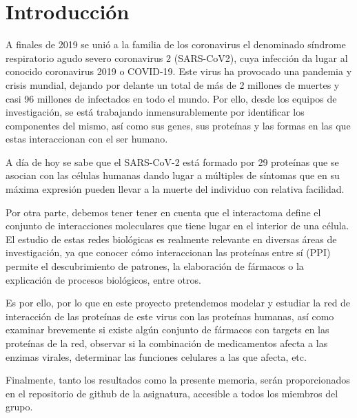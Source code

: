 \section{Introducción}

A finales de 2019 se unió a la familia de los coronavirus el denominado síndrome respiratorio agudo severo coronavirus 2 (SARS-CoV2), cuya infección da lugar al conocido coronavirus 2019 o COVID-19. Este virus ha provocado una pandemia y crisis mundial, dejando por delante un total de más de 2 millones de muertes y casi 96 millones de infectados en todo el mundo. Por ello, desde los equipos de investigación, se está trabajando inmensurablemente por identificar los componentes del mismo, así como sus genes, sus proteínas y las formas en las que estas interaccionan con el ser humano. 

A día de hoy se sabe que el SARS-CoV-2 está formado por 29 proteínas que se asocian con las células humanas dando lugar a múltiples de síntomas que en su máxima expresión pueden llevar a la muerte del individuo con relativa facilidad.

Por otra parte, debemos tener tener en cuenta que el interactoma define el conjunto de interacciones moleculares que tiene lugar en el interior de una célula. El estudio de estas redes biológicas es realmente relevante en diversas áreas de investigación, ya que conocer cómo interaccionan las proteínas entre sí (PPI) permite el descubrimiento de patrones, la elaboración de fármacos o la explicación de procesos biológicos, entre otros.

Es por ello, por lo que en este proyecto pretendemos modelar y estudiar la red de interacción de las proteínas de este virus con las proteínas humanas, así como examinar brevemente si existe algún conjunto de fármacos con targets en las proteínas de la red, observar si la combinación de medicamentos afecta a las enzimas virales, determinar las funciones celulares a las que afecta, etc.
 
Finalmente, tanto los resultados como la presente memoria,  serán proporcionados en el repositorio de github de la asignatura, accesible a todos los miembros del grupo.
